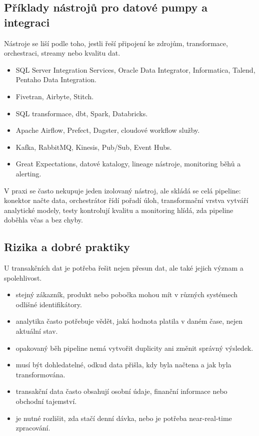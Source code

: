 \subsection{Příklady nástrojů pro datové pumpy a integraci}
Nástroje se liší podle toho, jestli řeší připojení ke zdrojům, transformace, orchestraci, streamy
nebo kvalitu dat.

\begin{itemize}
  \item {} SQL Server Integration Services, Oracle Data Integrator,
  Informatica, Talend, Pentaho Data Integration.
  \item {} Fivetran, Airbyte, Stitch.
  \item {} SQL transformace, dbt, Spark, Databricks.
  \item {} Apache Airflow, Prefect, Dagster, cloudové workflow služby.
  \item {} Kafka, RabbitMQ, Kinesis, Pub/Sub, Event Hubs.
  \item {} Great Expectations, datové katalogy, lineage nástroje,
  monitoring běhů a alerting.
\end{itemize}

V praxi se často nekupuje jeden izolovaný nástroj, ale skládá se celá pipeline: konektor načte data,
orchestrátor řídí pořadí úloh, transformační vrstva vytváří analytické modely, testy kontrolují kvalitu
a monitoring hlídá, zda pipeline doběhla včas a bez chyby.

\subsection{Rizika a dobré praktiky}
U transakčních dat je potřeba řešit nejen přesun dat, ale také jejich význam a spolehlivost.

\begin{itemize}
  \item {} stejný zákazník, produkt nebo pobočka mohou mít v různých
  systémech odlišné identifikátory.
  \item {} analytika často potřebuje vědět, jaká hodnota platila v daném čase,
  nejen aktuální stav.
  \item {} opakovaný běh pipeline nemá vytvořit duplicity ani změnit správný výsledek.
  \item {} musí být dohledatelné, odkud data přišla, kdy byla načtena a jak byla
  transformována.
  \item {} transakční data často obsahují osobní údaje, finanční informace nebo obchodní
  tajemství.
  \item {} je nutné rozlišit, zda stačí denní dávka, nebo je potřeba near-real-time zpracování.
\end{itemize}

